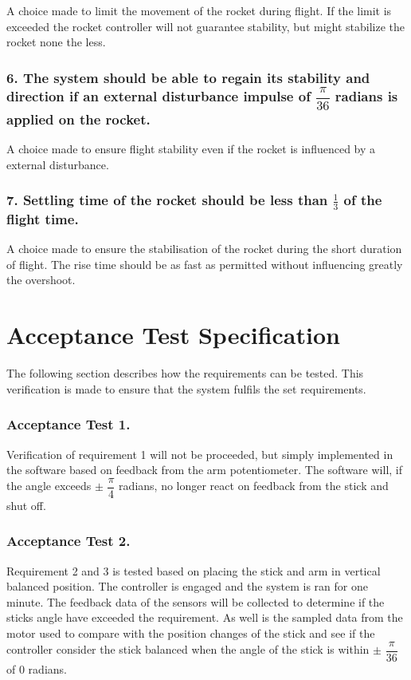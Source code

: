 \forceindent A choice made to limit the movement of the rocket during flight. If the limit is exceeded the rocket controller will not guarantee stability, but might stabilize the rocket none the less. 

\subsubsection*{6. The system should be able to regain its stability and direction if an external disturbance impulse of $\dfrac{\pi}{36}$ radians is applied on the rocket.} 

\forceindent  A choice made to ensure flight stability even if the rocket is influenced by a external disturbance.

\subsubsection*{7. Settling time of the rocket should be less than $\frac{1}{3}$ of the flight time.} 

\forceindent A choice made to ensure the stabilisation of the rocket during the short duration of flight. The rise time should be as fast as permitted without influencing greatly the overshoot. 



\section{Acceptance Test Specification}	\label{sec:TestDesc}
The following section describes how the requirements can be tested. This verification is made to ensure that the system fulfils the set requirements.

\subsubsection*{Acceptance Test 1.}

\forceindent Verification of requirement 1 will not be proceeded, but simply implemented in the software based on feedback from the arm potentiometer. The software will, if the angle exceeds $\pm$ $\dfrac{\pi}{4}$ radians, no longer react on feedback from the stick and shut off.

\subsubsection*{Acceptance Test 2.}

\forceindent Requirement 2 and 3 is tested based on placing the stick and arm in vertical balanced position. The controller is engaged and the system is ran for one minute. The feedback data of the sensors will be collected to determine if the sticks angle have exceeded the requirement. As well is the sampled data from the motor used to compare with the position changes of the stick and see if the controller consider the stick balanced when the angle of the stick is within $\pm$ $\dfrac{\pi}{36}$ of 0 radians. 

